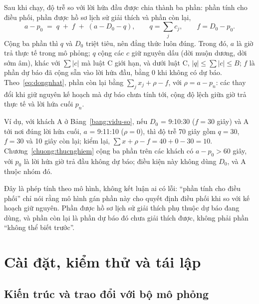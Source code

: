 Sau khi chạy, độ trễ so với lời hứa đầu được chia thành ba phần: phần tính cho điều phối, phần được hồ sơ lịch
sử giải thích và phần còn lại,
\begin{equation}
a - p_0 \;=\; q \;+\; f \;+\; (a - D_0 - q), \qquad q = \sum_{j} c_j, \qquad f = D_0 - p_0 .
\label{eq:so}
\end{equation}
Cộng ba phần thì $q$ và $D_0$ triệt tiêu, nên đẳng thức luôn đúng. Trong đó, $a$ là giờ trả thực tế trong mô
phỏng; $q$ cộng các $c$ giữ nguyên dấu (dời muộn dương, dời sớm âm), khác với $\sum |c|$ mà luật C giới hạn, và
dưới luật C, $|q| \le \sum |c| \le B$; $f$ là phần dự báo đã cộng sẵn vào lời hứa đầu, bằng 0 khi không có dự
báo. Theo~\eqref{eq:dongnhat}, phần còn lại bằng $\sum_j x_j + \rho - f$, với $\rho = a - p_n$: các thay đổi khi
giữ nguyên kế hoạch mà dự báo chưa tính tới, cộng độ lệch giữa giờ trả thực tế và lời hứa cuối $p_n$.

Ví dụ, với khách A ở Bảng~\ref{bang:vidu-so}, nếu $D_0$ = 9:10:30 ($f = 30$ giây) và A tới nơi đúng lời hứa cuối,
$a$ = 9:11:10 ($\rho = 0$), thì độ trễ 70 giây gồm $q = 30$, $f = 30$ và 10 giây còn lại; kiểm lại,
$\sum x + \rho - f = 40 + 0 - 30 = 10$. Chương~\ref{chuong:thucnghiem} cộng ba phần trên các khách có
$a - p_0 > 60$ giây, với $p_0$ là lời hứa giờ trả đầu không dự báo; điều kiện này không dùng $D_0$, và A thuộc
nhóm đó.

Đây là phép tính theo mô hình, không kết luận ai có lỗi: ``phần tính cho điều phối'' chỉ nói rằng mô hình gán
phần này cho quyết định điều phối khi so với kế hoạch giữ nguyên. Phần được hồ sơ lịch sử giải thích phụ thuộc
dự báo đang dùng, và phần còn lại là phần dự báo đó chưa giải thích được, không phải phần ``không thể biết
trước''.

\section{Cài đặt, kiểm thử và tái lập}
\label{muc:caidat}

\subsection{Kiến trúc và trao đổi với bộ mô phỏng}
\label{muc:kientruc}

